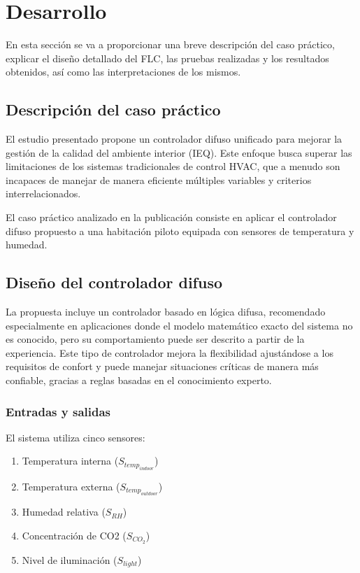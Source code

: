 \section{Desarrollo}

En esta sección se va a proporcionar una breve descripción del caso práctico, explicar el diseño detallado del FLC, las pruebas realizadas y los resultados obtenidos, así como las interpretaciones de los mismos. 

\subsection{Descripción del caso práctico}

El estudio presentado propone un controlador difuso unificado para mejorar la gestión de la calidad del ambiente interior (IEQ). Este enfoque busca superar las limitaciones de los sistemas tradicionales de control HVAC, que a menudo son incapaces de manejar de manera eficiente múltiples variables y criterios interrelacionados. 

El caso práctico analizado en la publicación consiste en aplicar el controlador difuso propuesto a una habitación piloto equipada con sensores de temperatura y humedad. 

\subsection{Diseño del controlador difuso}

La propuesta incluye un controlador basado en lógica difusa, recomendado especialmente en aplicaciones donde el modelo matemático exacto del sistema no es conocido, pero su comportamiento puede ser descrito a partir de la experiencia. Este tipo de controlador mejora la flexibilidad ajustándose a los requisitos de confort y puede manejar situaciones críticas de manera más confiable, gracias a reglas basadas en el conocimiento experto.

\subsubsection{Entradas y salidas}

El sistema utiliza cinco sensores:

\begin{enumerate}
	\item Temperatura interna ($S_{temp_{indoor}}$)
	\item Temperatura externa ($S_{temp_{outdoor}}$)
	\item Humedad relativa ($S_{RH}$)
	\item Concentración de CO2 ($S_{CO_2}$)
	\item Nivel de iluminación ($S_{light}$)
\end{enumerate}


